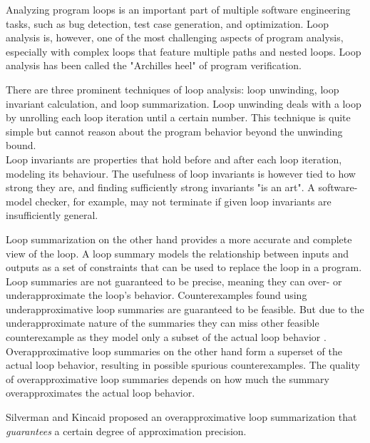 
Analyzing program loops is an important part of multiple software engineering tasks, such as bug detection, test case generation, and optimization. Loop analysis is, however, one of the most challenging aspects of program analysis, especially with complex loops that feature multiple paths and nested loops. Loop analysis has been called the "Archilles heel" of program verification\cite{0.1007/s10703-012-0176-y}. \par
There are three prominent techniques of loop analysis: loop unwinding, loop invariant calculation, and loop summarization\cite{0.1007/s10703-012-0176-y, 8241837,10.1007/978-3-030-25543-5_7}. Loop unwinding deals with a loop by unrolling each loop iteration until a certain number. This technique is quite simple but cannot reason about the program behavior beyond the unwinding bound. \\
Loop invariants are properties that hold before and after each loop iteration, modeling its behaviour. The usefulness of loop invariants is however tied to how strong they are, and finding sufficiently strong invariants "is an art"\cite{0.1007/s10703-012-0176-y}. A software-model checker, for example, may not terminate if given loop invariants are insufficiently general. \par
Loop summarization on the other hand provides a more accurate and complete view of the loop. A loop summary models the relationship between inputs and outputs as a set of constraints that can be used to replace the loop in a program. Loop summaries are not guaranteed to be precise, meaning they can over- or underapproximate the loop's behavior. Counterexamples found using underapproximative loop summaries are guaranteed to be feasible. But due to the underapproximate nature of the summaries they can miss other feasible counterexample as they model only a subset of the actual loop behavior \cite{10.1007/s10703-015-0228-1}. Overapproximative loop summaries on the other hand form a superset of the actual loop behavior, resulting in possible spurious counterexamples. The quality of overapproximative loop summaries depends on how much the summary overapproximates the actual loop behavior.\\ \par
Silverman and Kincaid\cite{10.1007/978-3-030-25543-5_7} proposed an overapproximative loop summarization that \textsl{guarantees} a certain degree of approximation precision.\par 
